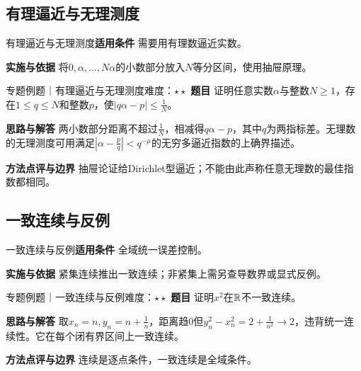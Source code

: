 \subsection{有理逼近与无理测度}\label{mat:real_foundations:approx}
\begin{method}{有理逼近与无理测度}\textbf{适用条件} 需要用有理数逼近实数。\par\textbf{实施与依据} 将$0,\alpha,\ldots,N\alpha$的小数部分放入$N$等分区间，使用抽屉原理。\end{method}
\begin{example}{专题例题｜有理逼近与无理测度}{难度：$\star\star$}
\textbf{题目} 证明任意实数$\alpha$与整数$N\ge1$，存在$1\le q\le N$和整数$p$，使$|q\alpha-p|\le\frac{1}{N}$。\par\textbf{思路与解答} 两小数部分距离不超过$\frac{1}{N}$，相减得$q\alpha-p$，其中$q$为两指标差。无理数的无理测度可用满足$|\alpha-\frac{p}{q}|<q^{-\mu}$的无穷多逼近指数的上确界描述。\par\textbf{方法点评与边界} 抽屉论证给Dirichlet型逼近；不能由此声称任意无理数的最佳指数都相同。
\end{example}
\subsection{一致连续与反例}\label{mat:real_foundations:uniform}
\begin{method}{一致连续与反例}\textbf{适用条件} 全域统一误差控制。\par\textbf{实施与依据} 紧集连续推出一致连续；非紧集上需另查导数界或显式反例。\end{method}
\begin{example}{专题例题｜一致连续与反例}{难度：$\star\star$}
\textbf{题目} 证明$x^2$在$\mathbb{R}$不一致连续。\par\textbf{思路与解答} 取$x_n=n,y_n=n+\frac{1}{n}$，距离趋0但$y_n^2-x_n^2=2+\frac{1}{n^2}\to2$，违背统一连续性。它在每个闭有界区间上一致连续。\par\textbf{方法点评与边界} 连续是逐点条件，一致连续是全域条件。
\end{example}

